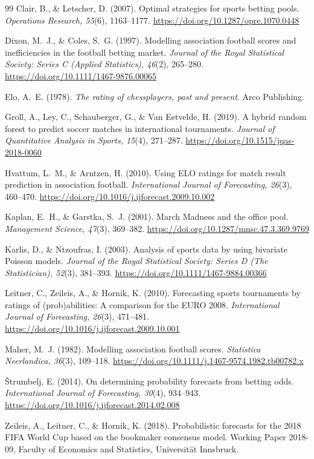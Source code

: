 \documentclass[11pt,a4paper]{article}
\begin{document}
\begin{thebibliography}{99}
Clair, B., \& Letscher, D. (2007). Optimal strategies for sports betting pools. \emph{Operations Research, 55}(6), 1163--1177. \url{https://doi.org/10.1287/opre.1070.0448}

Dixon, M.~J., \& Coles, S.~G. (1997). Modelling association football scores and inefficiencies in the football betting market. \emph{Journal of the Royal Statistical Society: Series C (Applied Statistics), 46}(2), 265--280. \url{https://doi.org/10.1111/1467-9876.00065}

Elo, A.~E. (1978). \emph{The rating of chessplayers, past and present}. Arco Publishing.

Groll, A., Ley, C., Schauberger, G., \& Van Eetvelde, H. (2019). A hybrid random forest to predict soccer matches in international tournaments. \emph{Journal of Quantitative Analysis in Sports, 15}(4), 271--287. \url{https://doi.org/10.1515/jqas-2018-0060}

Hvattum, L.~M., \& Arntzen, H. (2010). Using ELO ratings for match result prediction in association football. \emph{International Journal of Forecasting, 26}(3), 460--470. \url{https://doi.org/10.1016/j.ijforecast.2009.10.002}

Kaplan, E.~H., \& Garstka, S.~J. (2001). March Madness and the office pool. \emph{Management Science, 47}(3), 369--382. \url{https://doi.org/10.1287/mnsc.47.3.369.9769}

Karlis, D., \& Ntzoufras, I. (2003). Analysis of sports data by using bivariate Poisson models. \emph{Journal of the Royal Statistical Society: Series D (The Statistician), 52}(3), 381--393. \url{https://doi.org/10.1111/1467-9884.00366}

Leitner, C., Zeileis, A., \& Hornik, K. (2010). Forecasting sports tournaments by ratings of (prob)abilities: A comparison for the EURO 2008. \emph{International Journal of Forecasting, 26}(3), 471--481. \url{https://doi.org/10.1016/j.ijforecast.2009.10.001}

Maher, M.~J. (1982). Modelling association football scores. \emph{Statistica Neerlandica, 36}(3), 109--118. \url{https://doi.org/10.1111/j.1467-9574.1982.tb00782.x}

Štrumbelj, E. (2014). On determining probability forecasts from betting odds. \emph{International Journal of Forecasting, 30}(4), 934--943. \url{https://doi.org/10.1016/j.ijforecast.2014.02.008}

Zeileis, A., Leitner, C., \& Hornik, K. (2018). Probabilistic forecasts for the 2018 FIFA World Cup based on the bookmaker consensus model. Working Paper 2018-09, Faculty of Economics and Statistics, Universität Innsbruck.

\end{thebibliography}
\end{document}
